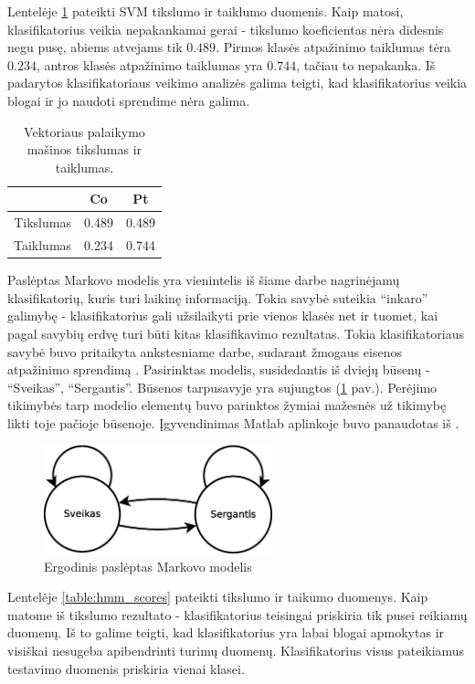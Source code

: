 \documentclass[]{vgtuef}
\begin{document}
Lentelėje \ref{table:svm_scores} pateikti SVM tikslumo ir taiklumo duomenis. Kaip matosi, klasifikatorius veikia nepakankamai gerai - tikslumo koeficientas nėra didesnis negu pusę, abiems atvejams tik $0.489$. Pirmos klasės atpažinimo taiklumas tėra $0.234$, antros klasės atpažinimo taiklumas yra $0.744$, tačiau to nepakanka. Iš padarytos klasifikatoriaus veikimo analizės galima teigti, kad klasifikatorius veikia blogai ir jo naudoti sprendime nėra galima.

\begin{table}[!t]
  \centering
  \caption{Vektoriaus palaikymo mašinos tikslumas ir taiklumas.}
  \label{table:svm_scores}
  \begin{tabular}{|c|c|c|} \hline
    & Co & Pt \\ \hline
    Tikslumas & 0.489 & 0.489 \\ \hline
    Taiklumas & 0.234 & 0.744 \\ \hline
  \end{tabular}
\end{table}

Paslėptas Markovo modelis \cite{18626} yra vienintelis iš šiame darbe nagrinėjamų klasifikatorių, kuris turi laikinę informaciją. Tokia savybė suteikia ``inkaro'' galimybę - klasifikatorius gali užsilaikyti prie vienos klasės net ir tuomet, kai pagal savybių erdvę turi būti kitas klasifikavimo rezultatas. Tokia klasifikatoriaus savybė buvo pritaikyta ankstesniame darbe, sudarant žmogaus eisenos atpažinimo sprendimą \cite{mano_darbas}. Pasirinktas modelis, susidedantis iš dviejų būsenų - ``Sveikas'', ``Sergantis''. Būsenos tarpusavyje yra sujungtos (\ref{fig:hmm_model} pav.). Perėjimo tikimybės tarp modelio elementų buvo parinktos žymiai mažesnės už tikimybę likti toje pačioje būsenoje. Įgyvendinimas Matlab aplinkoje buvo panaudotas iš \cite{website:hmm_implementation}.

\begin{figure}
	\centering
	\includegraphics[width=250px]{figures/hmm_modelis}
	\caption{Ergodinis paslėptas Markovo modelis}
	\label{fig:hmm_model}
\end{figure}

Lentelėje \ref{table:hmm_scores} pateikti tikslumo ir taikumo duomenys. Kaip matome iš tikslumo rezultato - klasifikatorius teisingai priskiria tik pusei reikiamų duomenų. Iš to galime teigti, kad klasifikatorius yra labai blogai apmokytas ir visiškai nesugeba apibendrinti turimų duomenų. Klasifikatorius visus pateikiamus testavimo duomenis priskiria vienai klasei.
\end{document}
